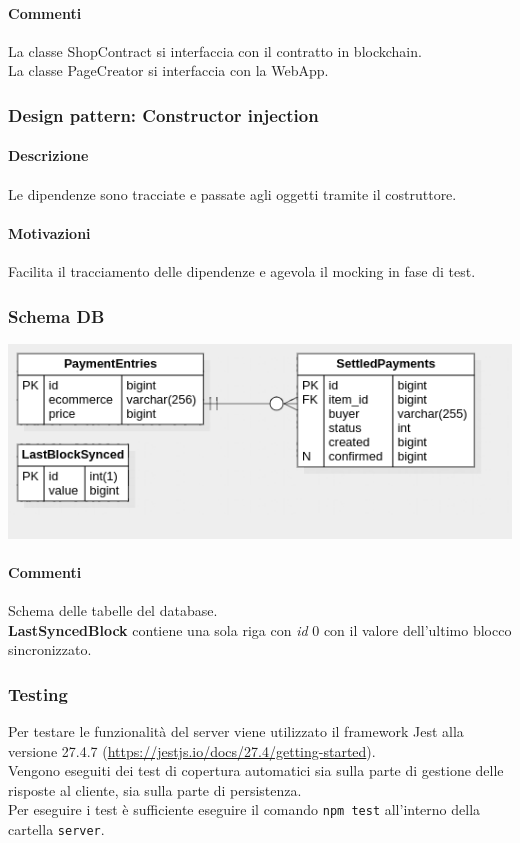 \documentclass[a4paper, 12pt]{article}
\begin{document}
\paragraph{Commenti}
La classe ShopContract si interfaccia con il contratto in blockchain.\\
La classe PageCreator si interfaccia con la WebApp.
\subsubsection{Design pattern: Constructor injection}
\paragraph{Descrizione}
Le dipendenze sono tracciate e passate agli oggetti tramite il costruttore.
\paragraph{Motivazioni}
Facilita il tracciamento delle dipendenze e agevola il mocking in fase di test.
\subsubsection{Schema DB}
\includegraphics[width=1.0\textwidth]{db}
\paragraph{Commenti}
Schema delle tabelle del database.\\
\textbf{LastSyncedBlock} contiene una sola riga con \textit{id} 0 con il valore dell'ultimo blocco sincronizzato.
\subsubsection{Testing}
Per testare le funzionalità del server viene utilizzato il framework Jest alla versione 27.4.7 (\href{https://jestjs.io/docs/27.4/getting-started}{https://jestjs.io/docs/27.4/getting-started}). \\
Vengono eseguiti dei test di copertura automatici sia sulla parte di gestione delle risposte al cliente, sia sulla parte di persistenza. \\
Per eseguire i test è sufficiente eseguire il comando \texttt{npm test} all'interno della cartella \texttt{server}.
\end{document}

